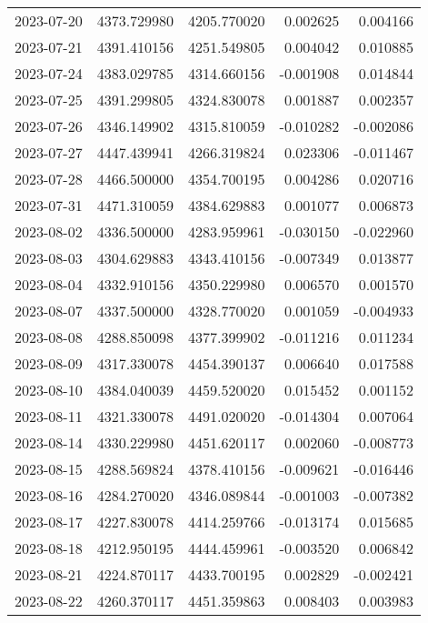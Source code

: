 \begin{tabular}{lrrrr}
2023-07-20 & 4373.729980 & 4205.770020 &        0.002625 &     0.004166 \\
2023-07-21 & 4391.410156 & 4251.549805 &        0.004042 &     0.010885 \\
2023-07-24 & 4383.029785 & 4314.660156 &       -0.001908 &     0.014844 \\
2023-07-25 & 4391.299805 & 4324.830078 &        0.001887 &     0.002357 \\
2023-07-26 & 4346.149902 & 4315.810059 &       -0.010282 &    -0.002086 \\
2023-07-27 & 4447.439941 & 4266.319824 &        0.023306 &    -0.011467 \\
2023-07-28 & 4466.500000 & 4354.700195 &        0.004286 &     0.020716 \\
2023-07-31 & 4471.310059 & 4384.629883 &        0.001077 &     0.006873 \\
2023-08-02 & 4336.500000 & 4283.959961 &       -0.030150 &    -0.022960 \\
2023-08-03 & 4304.629883 & 4343.410156 &       -0.007349 &     0.013877 \\
2023-08-04 & 4332.910156 & 4350.229980 &        0.006570 &     0.001570 \\
2023-08-07 & 4337.500000 & 4328.770020 &        0.001059 &    -0.004933 \\
2023-08-08 & 4288.850098 & 4377.399902 &       -0.011216 &     0.011234 \\
2023-08-09 & 4317.330078 & 4454.390137 &        0.006640 &     0.017588 \\
2023-08-10 & 4384.040039 & 4459.520020 &        0.015452 &     0.001152 \\
2023-08-11 & 4321.330078 & 4491.020020 &       -0.014304 &     0.007064 \\
2023-08-14 & 4330.229980 & 4451.620117 &        0.002060 &    -0.008773 \\
2023-08-15 & 4288.569824 & 4378.410156 &       -0.009621 &    -0.016446 \\
2023-08-16 & 4284.270020 & 4346.089844 &       -0.001003 &    -0.007382 \\
2023-08-17 & 4227.830078 & 4414.259766 &       -0.013174 &     0.015685 \\
2023-08-18 & 4212.950195 & 4444.459961 &       -0.003520 &     0.006842 \\
2023-08-21 & 4224.870117 & 4433.700195 &        0.002829 &    -0.002421 \\
2023-08-22 & 4260.370117 & 4451.359863 &        0.008403 &     0.003983 \\

\end{tabular}
